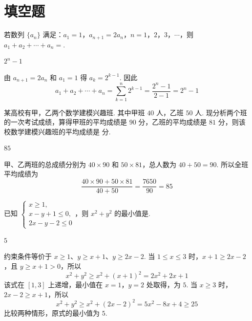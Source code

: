 \section{填空题}
\begin{problem}
若数列 \(\{a_n\}\) 满足：\(a_1=1\)，\(a_{n+1}=2a_n\)，\(n=1\)，\(2\)，\(3\)，\(\cdots\)，则 \(a_1+a_2+\cdots+a_n=\)\fillinblank{}.
\end{problem}

\begin{answer}
\(2^n-1\)
\end{answer}

\begin{solution}
由 \(a_{n+1}=2a_n\) 和 \(a_1=1\) 得 \(a_k=2^{k-1}\). 因此
\[
a_1+a_2+\cdots+a_n=\sum_{k=1}^{n}2^{k-1}=\frac{2^n-1}{2-1}=2^n-1
\]
\end{solution}

\begin{problem}
某高校有甲，乙两个数学建模兴趣班. 其中甲班 \(40\text{ 人}\)，乙班 \(50\text{ 人}\). 现分析两个班的一次考试成绩，算得甲班的平均成绩是 \(90\text{ 分}\)，乙班的平均成绩是 \(81\text{ 分}\)，则该校数学建模兴趣班的平均成绩是\fillinblank{}\(\text{ 分}\).
\end{problem}

\begin{answer}
\(85\)
\end{answer}

\begin{solution}
甲、乙两班的总成绩分别为 \(40\times90\) 和 \(50\times81\)，总人数为 \(40+50=90\). 所以全班平均成绩为
\[
\frac{40\times90+50\times81}{40+50}=\frac{7650}{90}=85
\]
\end{solution}

\begin{problem}
已知 \(\begin{cases}
x\geqslant1,\\
x-y+1\leqslant0,\\
2x-y-2\leqslant0
\end{cases}\)，则 \(x^2+y^2\) 的最小值是\fillinblank{}.
\end{problem}

\begin{answer}
\(5\)
\end{answer}

\begin{solution}
约束条件等价于 \(x\geqslant1\)、\(y\geqslant x+1\)、\(y\geqslant2x-2\). 当 \(1\leqslant x\leqslant3\) 时，\(x+1\geqslant2x-2\)，且 \(y\geqslant x+1>0\)，所以
\[
x^2+y^2\geqslant x^2+(x+1)^2=2x^2+2x+1
\]
该式在 \([1,3]\) 上递增，最小值在 \(x=1\)，\(y=2\) 处取得，为 \(5\). 当 \(x\geqslant3\) 时，\(2x-2\geqslant x+1\)，所以
\[
x^2+y^2\geqslant x^2+(2x-2)^2=5x^2-8x+4\geqslant25
\]
比较两种情形，原式的最小值为 \(5\).
\end{solution}

